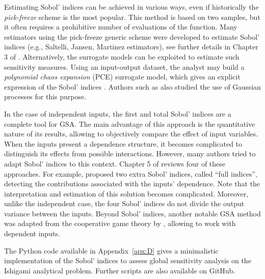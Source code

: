 Estimating Sobol' indices can be achieved in various ways, even if historically the \textit{pick-freeze} scheme is the most popular. 
This method is based on two samples, but it often requires a prohibitive number of evaluations of the function. 
Many estimators using the pick-freeze generic scheme were developed to estimate Sobol' indices (e.g., Saltelli, Jansen, Martinez estimators), see further details in Chapter 3 of \citet{daveiga_iooss_2021}. 
Alternatively, the surrogate models can be exploited to estimate such sensitivity measures. 
Using an input-output dataset, the analyst may build a \textit{polynomial chaos expansion} (PCE) surrogate model, which gives an explicit expression of the Sobol' indices \citep{sudret_2008}. 
Authors such as \citet{marrel_2009} also studied the use of Gaussian processes for this purpose. 
  
In the case of independent inputs, the first and total Sobol' indices are a complete tool for GSA. 
The main advantage of this approach is the quantitative nature of its results, allowing to objectively compare the effect of input variables. 
When the inputs present a dependence structure, it becomes complicated to distinguish its effects from possible interactions. 
However, many authors tried to adapt Sobol' indices to this context. 
Chapter 5 of \citet{daveiga_iooss_2021} reviews four of these approaches. 
For example, \citet{mara_tarantola_2012} proposed two extra Sobol' indices, called ``full indices'', detecting the contributions associated with the inputs' dependence. 
Note that the interpretation and estimation of this solution becomes complicated. 
Moreover, unlike the independent case, the four Sobol' indices do not divide the output variance between the inputs. 
Beyond Sobol' indices, another notable GSA method was adapted from the cooperative game theory by \citet{owen_2014_shapley}, allowing to work with dependent inputs.   

\begin{otexample}
    The Python code available in Appendix~\ref{apx:D} gives a minimalistic \ots implementation of the Sobol' indices to assess global sensitivity analysis on the Ishigami analytical problem.
    Further scripts are also available on GitHub\footnotemark.  
\end{otexample}

